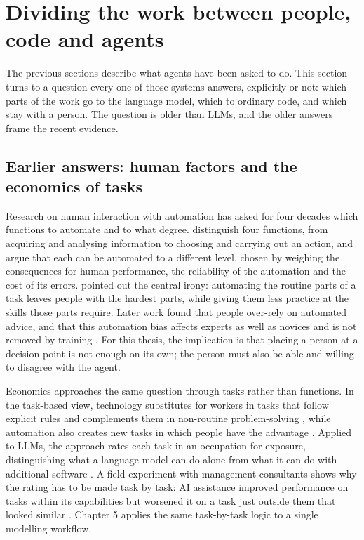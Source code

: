 \section{Dividing the work between people, code and agents}

The previous sections describe what agents have been asked to do.
This section turns to a question every one of those systems answers, explicitly or not: which parts of the work go to the language model, which to ordinary code, and which stay with a person.
The question is older than LLMs, and the older answers frame the recent evidence.

\subsection{Earlier answers: human factors and the economics of tasks}

Research on human interaction with automation has asked for four decades which functions to automate and to what degree.
\citet{parasuraman2000model} distinguish four functions, from acquiring and analysing information to choosing and carrying out an action, and argue that each can be automated to a different level, chosen by weighing the consequences for human performance, the reliability of the automation and the cost of its errors.
\citet{bainbridge1983ironies} pointed out the central irony: automating the routine parts of a task leaves people with the hardest parts, while giving them less practice at the skills those parts require.
Later work found that people over-rely on automated advice, and that this automation bias affects experts as well as novices and is not removed by training \citep{parasuraman2010complacency}.
For this thesis, the implication is that placing a person at a decision point is not enough on its own; the person must also be able and willing to disagree with the agent.

Economics approaches the same question through tasks rather than functions.
In the task-based view, technology substitutes for workers in tasks that follow explicit rules and complements them in non-routine problem-solving \citep{autor2003skill}, while automation also creates new tasks in which people have the advantage \citep{acemoglu2019automation}.
Applied to LLMs, the approach rates each task in an occupation for exposure, distinguishing what a language model can do alone from what it can do with additional software \citep{eloundou2024gpts}.
A field experiment with management consultants shows why the rating has to be made task by task: AI assistance improved performance on tasks within its capabilities but worsened it on a task just outside them that looked similar \citep{dellacqua2026navigating}.
Chapter 5 applies the same task-by-task logic to a single modelling workflow.

